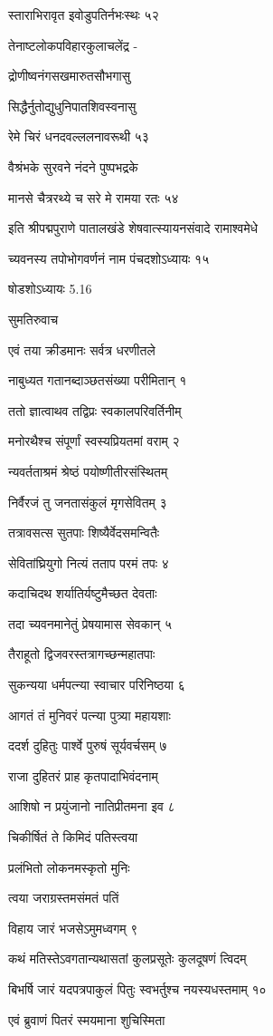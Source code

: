 स्ताराभिरावृत इवोडुपतिर्नभःस्थः ५२

तेनाष्टलोकपविहारकुलाचलेंद्र -

द्रोणीष्वनंगसखमारुतसौभगासु

सिद्धैर्नुतोद्युधुनिपातशिवस्वनासु

रेमे चिरं धनदवल्ललनावरूथी ५३

वैश्रंभके सुरवने नंदने पुष्पभद्रके

मानसे चैत्ररथ्ये च सरे मे रामया रतः ५४

इति श्रीपद्मपुराणे पातालखंडे शेषवात्स्यायनसंवादे रामाश्वमेधे

च्यवनस्य तपोभोगवर्णनं नाम पंचदशोऽध्यायः १५

षोडशोऽध्यायः 5.16

सुमतिरुवाच

एवं तया क्रीडमानः सर्वत्र धरणीतले

नाबुध्यत गतानब्दाञ्छतसंख्या परीमितान् १

ततो ज्ञात्वाथव तद्विप्रः स्वकालपरिवर्तिनीम्

मनोरथैश्च संपूर्णां स्वस्यप्रियतमां वराम् २

न्यवर्तताश्रमं श्रेष्ठं पयोष्णीतीरसंस्थितम्

निर्वैरजं तु जनतासंकुलं मृगसेवितम् ३

तत्रावसत्स सुतपाः शिष्यैर्वेदसमन्वितैः

सेवितांघ्रियुगो नित्यं तताप परमं तपः ४

कदाचिदथ शर्यातिर्यष्टुमैच्छत देवताः

तदा च्यवनमानेतुं प्रेषयामास सेवकान् ५

तैराहूतो द्विजवरस्तत्रागच्छन्महातपाः

सुकन्यया धर्मपत्न्या स्वाचार परिनिष्ठया ६

आगतं तं मुनिवरं पत्न्या पुत्र्या महायशाः

ददर्श दुहितुः पार्श्वे पुरुषं सूर्यवर्चसम् ७

राजा दुहितरं प्राह कृतपादाभिवंदनाम्

आशिषो न प्रयुंजानो नातिप्रीतमना इव ८

चिकीर्षितं ते किमिदं पतिस्त्वया

प्रलंभितो लोकनमस्कृतो मुनिः

त्वया जराग्रस्तमसंमतं पतिं

विहाय जारं भजसेऽमुमध्वगम् ९

कथं मतिस्तेऽवगतान्यथासतां कुलप्रसूतेः कुलदूषणं त्विदम्

बिभर्षि जारं यदपत्रपाकुलं पितुः स्वभर्तुश्च नयस्यधस्तमाम् १०

एवं ब्रुवाणं पितरं स्मयमाना शुचिस्मिता

